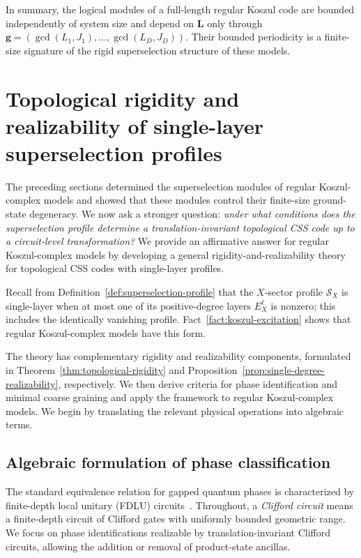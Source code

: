 \documentclass[aps,prx,english,superscriptaddress,twocolumn,tightenlines,showpacs,longbibliography,floatfix,amsfonts]{revtex4-2}
\theoremstyle{remark}
\theoremstyle{definition}
\begin{document}
In summary, the logical modules of a full-length regular Koszul code are
bounded independently of system size and depend on \(\mathbf L\) only through
\(\mathbf g=(\gcd(L_1,J_1),\dots,\gcd(L_D,J_D))\). Their bounded periodicity
is a finite-size signature of the rigid superselection structure of these
models.


\section{Topological rigidity and realizability of single-layer superselection profiles}
\label{sec:structure_module}

The preceding sections determined the superselection modules of regular
Koszul-complex models and showed that these modules control their finite-size
ground-state degeneracy. We now ask a stronger question: \emph{under what conditions does the superselection profile determine a translation-invariant topological CSS code up to a circuit-level transformation?}
We provide an affirmative answer for regular Koszul-complex models by developing a general rigidity-and-realizability theory for topological CSS codes with single-layer profiles.

Recall from Definition~\ref{def:superselection-profile} that the \(X\)-sector
profile \(\mathscr S_X\) is single-layer when at most one of its positive-degree
layers \(E_X^\ell\) is nonzero; this includes the identically vanishing profile.
Fact~\ref{fact:koszul-excitation} shows that regular Koszul-complex models have
this form.

The theory has complementary rigidity and realizability components, formulated
in Theorem~\ref{thm:topological-rigidity} and
Proposition~\ref{prop:single-degree-realizability}, respectively. We then derive
criteria for phase identification and minimal coarse graining and apply the
framework to regular Koszul-complex models. We begin by translating the
relevant physical operations into algebraic terms.

\subsection{Algebraic formulation of phase classification}

The standard equivalence relation for gapped quantum phases is characterized
by finite-depth local unitary (FDLU) circuits~\cite{Chen2010, Hastings2005,
Osborne2007, Verstraete2005}. Throughout, a \emph{Clifford circuit} means a
finite-depth circuit of Clifford gates with uniformly bounded geometric range.
We focus on phase identifications realizable by translation-invariant Clifford
circuits, allowing the addition or removal of product-state ancillas. %
\end{document}
